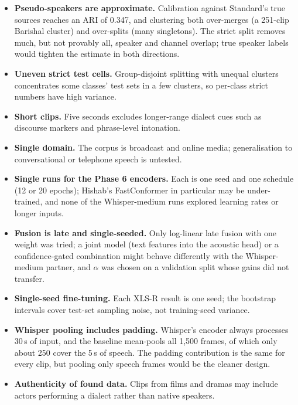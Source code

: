 \begin{itemize}
  \item \textbf{Pseudo-speakers are approximate.} Calibration against Standard's
        true sources reaches an ARI of 0.347, and clustering both over-merges (a
        251-clip Barishal cluster) and over-splits (many singletons). The strict
        split removes much, but not provably all, speaker and channel overlap;
        true speaker labels would tighten the estimate in both directions.
  \item \textbf{Uneven strict test cells.} Group-disjoint splitting with
        unequal clusters concentrates some classes' test sets in a few clusters,
        so per-class strict numbers have high variance.
  \item \textbf{Short clips.} Five seconds excludes longer-range dialect cues
        such as discourse markers and phrase-level intonation.
  \item \textbf{Single domain.} The corpus is broadcast and online media;
        generalisation to conversational or telephone speech is untested.
  \item \textbf{Single runs for the Phase 6 encoders.} Each is one seed and
        one schedule (12 or 20 epochs); Hishab's FastConformer in particular
        may be under-trained, and none of the Whisper-medium runs explored
        learning rates or longer inputs.
  \item \textbf{Fusion is late and single-seeded.} Only log-linear late
        fusion with one weight was tried; a joint model (text features into the
        acoustic head) or a confidence-gated combination might behave
        differently with the Whisper-medium partner, and $\alpha$ was chosen
        on a validation split whose gains did not transfer.
  \item \textbf{Single-seed fine-tuning.} Each XLS-R result is one seed; the
        bootstrap intervals cover test-set sampling noise, not training-seed
        variance.
  \item \textbf{Whisper pooling includes padding.} Whisper's encoder always
        processes 30\,s of input, and the baseline mean-pools all 1,500 frames,
        of which only about 250 cover the 5\,s of speech. The padding
        contribution is the same for every clip, but pooling only speech frames
        would be the cleaner design.
  \item \textbf{Authenticity of found data.} Clips from films and dramas may
        include actors performing a dialect rather than native speakers.

\end{itemize}
